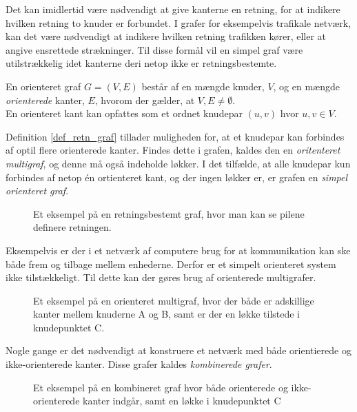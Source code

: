 Det kan imidlertid være nødvendigt at give kanterne en retning, for at indikere hvilken retning to knuder er forbundet.
I grafer for eksempelvis trafikale netværk, kan det være nødvendigt at indikere hvilken retning trafikken kører, eller at angive ensrettede strækninger.
Til disse formål vil en simpel graf være utilstrækkelig idet kanterne deri netop ikke er retningsbestemte.

\begin{defn}
En orienteret graf $G = (V, E)$ består af en mængde knuder, $V$, og en mængde \textit{orienterede} kanter, $E$, hvorom der gælder, at $V, E \neq \emptyset$.\\
En orienteret kant kan opfattes som et ordnet knudepar $(u,v)$ hvor $u,v \in  V$.
\label{def_retn_graf}
\end{defn} 

Definition \ref{def_retn_graf} tillader muligheden for, at et knudepar kan forbindes af optil flere orienterede kanter.
Findes dette i grafen, kaldes den en \textit{oritenteret multigraf}, og denne må også indeholde løkker.
I det tilfælde, at alle knudepar kun forbindes af netop én ortienteret kant, og der ingen løkker er, er grafen en \textit{simpel orienteret graf}.

\begin{figure}[h]
	\centering
	
	\caption{Et eksempel på en retningsbestemt graf, hvor man kan se pilene definere retningen.}
\end{figure}

Eksempelvis er der i et netværk af computere brug for at kommunikation kan ske både frem og tilbage mellem enhederne.
Derfor er et simpelt orienteret system ikke tilstækkeligt.
Til dette kan der gøres brug af orienterede multigrafer.

\begin{figure}[h]
	\centering
	
	\caption{Et eksempel på en orienteret multigraf, hvor der både er adskillige kanter mellem knuderne A og B, samt er der en løkke tilstede i knudepunktet C.}
\end{figure}


Nogle gange er det nødvendigt at konstruere et netværk med både orientierede og ikke-orienterede kanter. Disse grafer kaldes \textit{kombinerede grafer}.

\begin{figure}[!h]
	\centering
	
	\caption{Et eksempel på en kombineret graf hvor både orienterede og ikke-orienterede kanter indgår, samt en løkke i knudepunktet C}
\end{figure}

